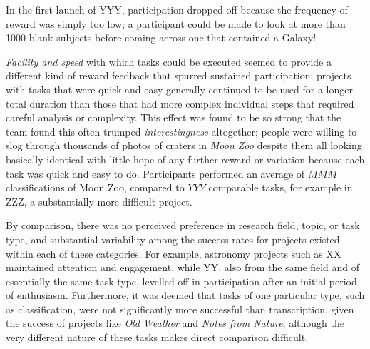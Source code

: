 \documentclass{sigchi}
\begin{document}
In the first launch of YYY, participation dropped off because the frequency of reward was simply too low; a participant could be made to look at more than 1000 blank subjects before coming across one that contained a Galaxy! 

\emph{Facility and speed} with which tasks could be executed seemed to provide a different kind of reward feedback that spurred sustained participation; projects with tasks that were quick and easy generally continued to be used for a longer total duration than those that had more complex individual steps that required careful analysis or complexity.  This effect was found to be so strong that the team found this often trumped \emph{interestingness} altogether; people were willing to slog through thousands of photos of craters in \emph{Moon Zoo} despite them all looking basically identical with little hope of any further reward or variation because each task was quick and easy to do.  Participants performed an average of $MMM$ classifications of Moon Zoo, compared to $YYY$ comparable tasks, for example in ZZZ, a substantially more difficult project.

By comparison, there was no perceived preference in research field, topic, or task type, and substantial variability among the success rates for projects existed within each of these categories.  For example, astronomy projects such as XX maintained attention and engagement, while YY, also from the same field and of essentially the same task type, levelled off in participation after an initial period of enthusiasm.   Furthermore, it was deemed that tasks of one particular type, such as classification, were not significantly more successful than transcription, given the success of projects like \emph{Old Weather} and \emph{Notes from Nature}, although the very different nature of these tasks makes direct comparison difficult.

\end{document}
